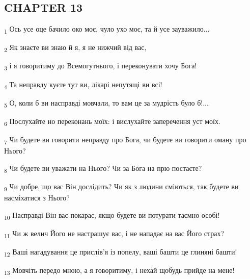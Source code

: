\subsection{CHAPTER 13}
\begin{tcolorbox}
\textsubscript{1} Ось усе оце бачило око моє, чуло ухо моє, та й усе зауважило...
\end{tcolorbox}
\begin{tcolorbox}
\textsubscript{2} Як знаєте ви знаю й я, я не нижчий від вас,
\end{tcolorbox}
\begin{tcolorbox}
\textsubscript{3} і я говоритиму до Всемогутнього, і переконувати хочу Бога!
\end{tcolorbox}
\begin{tcolorbox}
\textsubscript{4} Та неправду куєте тут ви, лікарі непутящі ви всі!
\end{tcolorbox}
\begin{tcolorbox}
\textsubscript{5} О, коли б ви насправді мовчали, то вам це за мудрість було б!...
\end{tcolorbox}
\begin{tcolorbox}
\textsubscript{6} Послухайте но переконань моїх: і вислухайте заперечення уст моїх.
\end{tcolorbox}
\begin{tcolorbox}
\textsubscript{7} Чи будете ви говорити неправду про Бога, чи будете ви говорити оману про Нього?
\end{tcolorbox}
\begin{tcolorbox}
\textsubscript{8} Чи будете ви уважати на Нього? Чи за Бога на прю постаєте?
\end{tcolorbox}
\begin{tcolorbox}
\textsubscript{9} Чи добре, що вас Він дослідить? Чи як з людини сміються, так будете ви насміхатися з Нього?
\end{tcolorbox}
\begin{tcolorbox}
\textsubscript{10} Насправді Він вас покарає, якщо будете ви потурати таємно особі!
\end{tcolorbox}
\begin{tcolorbox}
\textsubscript{11} Чи ж велич Його не настрашує вас, і не нападає на вас Його страх?
\end{tcolorbox}
\begin{tcolorbox}
\textsubscript{12} Ваші нагадування це прислів'я із попелу, ваші башти це глиняні башти!
\end{tcolorbox}
\begin{tcolorbox}
\textsubscript{13} Мовчіть передо мною, а я говоритиму, і нехай щобудь прийде на мене!
\end{tcolorbox}
